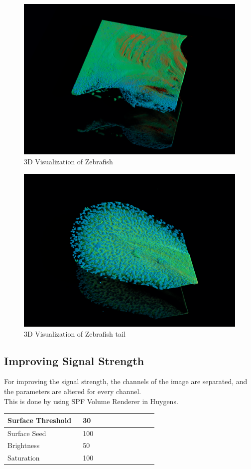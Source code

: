 \documentclass{article}
\begin{document}
\begin{figure}[h!]
    \centering
    \includegraphics[width=0.75\linewidth]{Report/Images/6.4-9/image_2.png}
    \caption{3D Visualization of Zebrafish}
    \label{fig:zebrafish_2}
\end{figure}
\begin{figure}[h!]
    \centering
    \includegraphics[width=0.75\linewidth]{Report/Images/6.4-9/image_3.png}
    \caption{3D Visualization of Zebrafish tail}
    \label{fig:zebrafish_tail}
\end{figure}
\clearpage
\subsection*{Improving Signal Strength} \label{Signal_Strength}
For improving the signal strength, the channels of the image are separated, and the parameters are altered for every channel. \\
This is done by using SPF Volume Renderer in Huygens. 
\begin{table}[h!]
    \centering
    \begin{tabular}{|p{0.3\linewidth} | p{0.3\linewidth}|}
    \hline
       Surface Threshold & 30 \\   \hline
       Surface Seed & 100 \\  \hline
       Brightness & 50 \\  \hline
       Saturation & 100 \\ \hline
    \end{tabular}
    \label{tab:signal}
\end{table}
\end{document}
